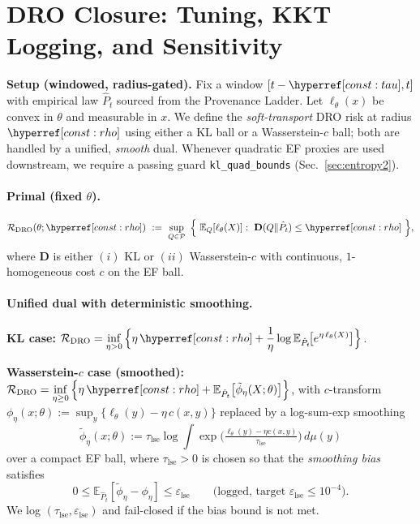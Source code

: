 \section{DRO Closure: Tuning, KKT Logging, and Sensitivity}\label{sec:closure2}

\noindent\textbf{Setup (windowed, radius-gated).}
Fix a window $[t-\constref{tau},t]$ with empirical law $\hat P_t$ sourced from the Provenance Ladder.
Let $\ell_\theta(x)$ be convex in $\theta$ and measurable in $x$.
We define the \emph{soft-transport} DRO risk at radius $\constref{rho}$ using either a KL ball or a Wasserstein-$c$ ball; both are handled by a unified, \emph{smooth} dual.
Whenever quadratic EF proxies are used downstream, we require a passing guard \texttt{kl\_quad\_bounds} (Sec.~\ref{sec:entropy2}).

\paragraph{Primal (fixed $\theta$).}
\[
\mathcal R_{\mathrm{DRO}}(\theta;\constref{rho})
~:=~
\sup_{Q\in\mathcal P}~\Big\{~\mathbb E_Q[\ell_\theta(X)]:~\mathbf D(Q\|\hat P_t)\le \constref{rho}~\Big\},
\]
where $\mathbf D$ is either $(i)$ KL or $(ii)$ Wasserstein-$c$ with continuous, $1$-homogeneous cost $c$ on the EF ball.

\paragraph{Unified dual with deterministic smoothing.}
\textbf{KL case:}\quad
$\displaystyle \mathcal R_{\mathrm{DRO}}
=\inf_{\eta>0}\Big\{\eta\,\constref{rho}+\frac{1}{\eta}\log \mathbb E_{\hat P_t}\!\big[e^{\eta\,\ell_\theta(X)}\big]\Big\}$.

\noindent
\textbf{Wasserstein-$c$ case (smoothed):}\quad
$\displaystyle \mathcal R_{\mathrm{DRO}}
=\inf_{\eta\ge 0}\Big\{\eta\,\constref{rho}+\mathbb E_{\hat P_t}\big[\tilde\phi_\eta(X;\theta)\big]\Big\}$,
with $c$-transform $\phi_\eta(x;\theta){:=}\sup_{y}\{\ell_\theta(y)-\eta\,c(x,y)\}$ replaced by a log-sum-exp smoothing
\[
\tilde\phi_\eta(x;\theta):=\tau_{\mathrm{lse}}\log\!\int\!\exp\!\big(\tfrac{\ell_\theta(y)-\eta c(x,y)}{\tau_{\mathrm{lse}}}\big)\,d\mu(y)
\]
over a compact EF ball, where $\tau_{\mathrm{lse}}\!>\!0$ is chosen so that the \emph{smoothing bias} satisfies
\[
0 \le \mathbb E_{\hat P_t}[\tilde\phi_\eta-\phi_\eta] \le \varepsilon_{\mathrm{lse}}
\qquad\text{(logged, target }\varepsilon_{\mathrm{lse}}\le 10^{-4}\text{)}.
\]
We log $(\tau_{\mathrm{lse}},\varepsilon_{\mathrm{lse}})$ and fail-closed if the bias bound is not met.

